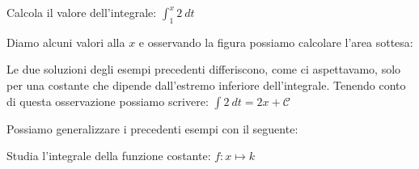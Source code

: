 \begin{esempio}
Calcola il valore dell'integrale: \(\displaystyle \int_1^x 2~dt\)

Diamo alcuni valori alla \(x\) e osservando la figura possiamo calcolare 
l'area sottesa:

\end{esempio}

Le due soluzioni degli esempi precedenti differiscono, come ci aspettavamo, 
solo per una costante che dipende dall'estremo inferiore dell'integrale. 
Tenendo conto di questa osservazione possiamo scrivere: \quad
\(\displaystyle \int 2~dt = 2x + \mathcal{C}\)

Possiamo generalizzare i precedenti esempi con il seguente:

\begin{esempio}
Studia l'integrale della funzione costante: \(f: x \mapsto k\)

\end{esempio}

